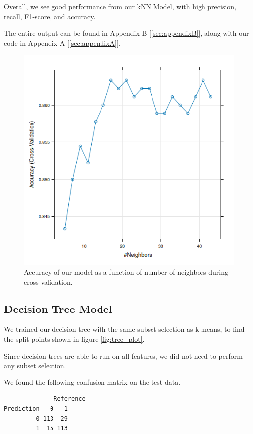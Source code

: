 \documentclass{article}
\begin{document}
Overall, we see good performance from our kNN Model, with high precision, recall, F1-score, and accuracy.

The entire output can be found in Appendix B [\ref{sec:appendixB}], along with our code in Appendix A [\ref{sec:appendixA}].

\begin{figure}
	\centering
	\includegraphics[width=\linewidth]{cv_plot}
	\caption{ Accuracy of our model as a function of number of neighbors during cross-validation.}
	\label{fig:cvPlot}
\end{figure}
\clearpage

\subsection*{Decision Tree Model}
We trained our decision tree with the same subset selection as k means, to find the split points shown in figure \ref{fig:tree_plot}.


Since decision trees are able to run on all features, we did not need to perform any subset selection.

We found the following confusion matrix on the test data.

\begin{verbatim}
              Reference
Prediction   0   1
         0 113  29
         1  15 113
\end{verbatim}
\end{document}
